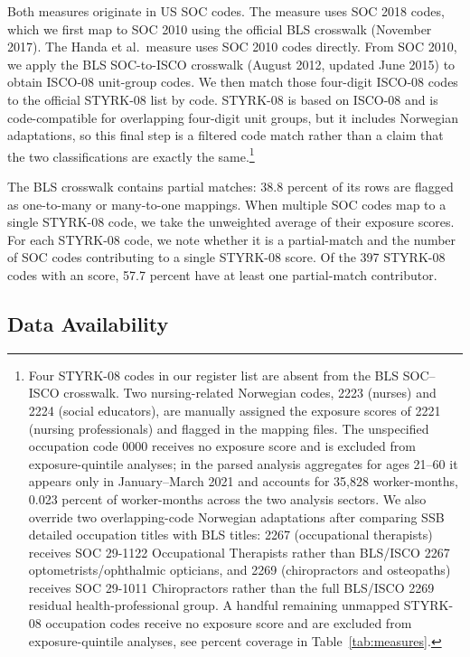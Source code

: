 \documentclass[12pt]{article}
\begin{document}
Both measures originate in US SOC codes. The \citet{eloundou2024} measure uses SOC 2018 codes, which we first map to SOC 2010 using the official BLS crosswalk (November 2017). The Handa et al.\ measure uses SOC 2010 codes directly. From SOC 2010, we apply the BLS SOC-to-ISCO crosswalk (August 2012, updated June 2015) to obtain ISCO-08 unit-group codes. We then match those four-digit ISCO-08 codes to the official STYRK-08 list by code. STYRK-08 is based on ISCO-08 and is code-compatible for overlapping four-digit unit groups, but it includes Norwegian adaptations, so this final step is a filtered code match rather than a claim that the two classifications are exactly the same.\footnote{Four STYRK-08 codes in our register list are absent from the BLS SOC--ISCO crosswalk. Two nursing-related Norwegian codes, 2223 (nurses) and 2224 (social educators), are manually assigned the exposure scores of 2221 (nursing professionals) and flagged in the mapping files. The unspecified occupation code 0000 receives no exposure score and is excluded from exposure-quintile analyses; in the parsed analysis aggregates for ages 21--60 it appears only in January--March 2021 and accounts for 35,828 worker-months, 0.023 percent of worker-months across the two analysis sectors. We also override two overlapping-code Norwegian adaptations after comparing SSB detailed occupation titles with BLS titles: 2267 (occupational therapists) receives SOC 29-1122 Occupational Therapists rather than BLS/ISCO 2267 optometrists/ophthalmic opticians, and 2269 (chiropractors and osteopaths) receives SOC 29-1011 Chiropractors rather than the full BLS/ISCO 2269 residual health-professional group. A handful remaining unmapped STYRK-08 occupation codes receive no exposure score and are excluded from exposure-quintile analyses, see percent coverage in Table~\ref{tab:measures}.}

The BLS crosswalk contains partial matches: 38.8 percent of its rows are flagged as one-to-many or many-to-one mappings. When multiple SOC codes map to a single STYRK-08 code, we take the unweighted average of their exposure scores. For each STYRK-08 code, we note whether it is a partial-match and the number of SOC codes contributing to a single STYRK-08 score. Of the 397 STYRK-08 codes with an \citet{eloundou2024} score, 57.7 percent have at least one partial-match contributor.


\subsection*{Data Availability}
\end{document}
